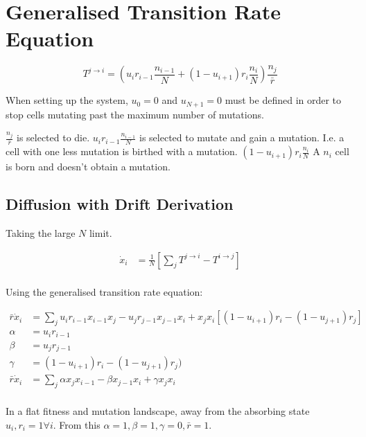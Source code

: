 \documentclass[a4paper]{article}
\begin{document}
\section{Generalised Transition Rate Equation}

\begin{equation}
T^{j\rightarrow i} = \left(u_i r_{i-1} \frac{n_{i-1}}{N} + \left(1 - u_{i+1} \right) r_i \frac{n_i}{N} \right) \frac{n_j}{\bar{r}}
\end{equation}

When setting up the system, $u_0 = 0$ and $u_{N+1} = 0$ must be defined in order to stop cells mutating past the maximum number of mutations. 

$\frac{n_j}{\bar{r}}$ is selected to die.
$u_i r_{i-1} \frac{n_{i-1}}{N}$ is selected to mutate and gain a mutation. I.e. a cell with one less mutation is birthed with a mutation. 
$\left(1 - u_{i+1} \right) r_i \frac{n_i}{N}$ A $n_i$ cell is born and doesn't obtain a mutation.

\subsection{Diffusion with Drift Derivation}

Taking the large $N$ limit. 

\begin{align*}
 \dot{x} _i & = \frac{1}{N} \left[ \sum _j T^{j \rightarrow i} - T^{i \rightarrow j} \right]\\
\end{align*}

Using the generalised transition rate equation:

\begin{align*}
\bar{r} \dot{x}_i & = \sum _j u _i r_{i-1} x_{i-1} x_j - u_j r_{j-1} x_{j-1} x_{i} + x_j x_i \left[ ( 1- u_{i+1} ) r_i - (1 - u_{j+1} ) r_j \right] \\
\alpha & = u _i r _{i-1} \\
\beta & = u_j r_{j-1} \\
\gamma & = ( 1 - u_{i+1} ) r_i - ( 1- u_{j+1} )r_j ) \\
\bar{r} \dot{x}_i & = \sum _j \alpha x_j x_{i-1} - \beta x_{j-1} x_i + \gamma x_j x_i \\
\end{align*}

In a flat fitness and mutation landscape, away from the absorbing state $ u_i, r_i = 1 \forall i$. 
From this $\alpha = 1, \beta = 1, \gamma = 0, \bar{r} = 1$.
\end{document}
